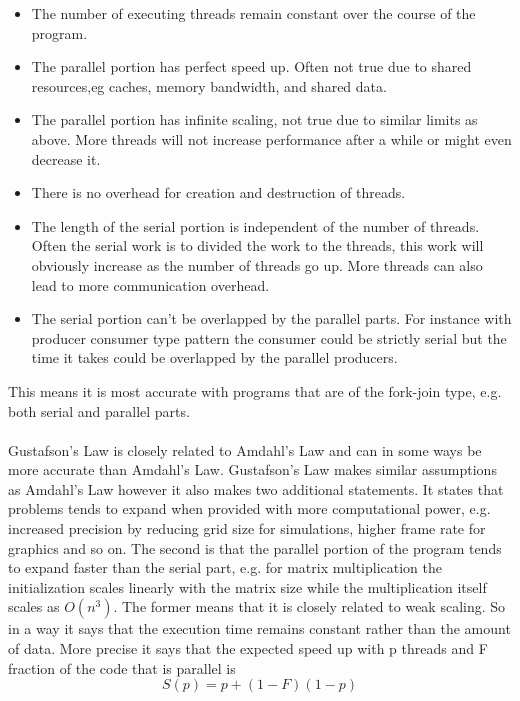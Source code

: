 \documentclass[10pt,a4paper]{report}
\begin{document}
\begin{itemize}
  \item The number of executing threads remain constant over the course of the program.
  \item The parallel portion has perfect speed up. Often not true due to shared resources,eg caches, memory bandwidth, and shared data.
  \item The parallel portion has infinite scaling, not true due to similar limits as above. More threads will not increase performance after a while or might even decrease it.
  \item There is no overhead for creation and destruction of threads.
  \item The length of the serial portion is independent of the number of threads. Often the serial work is to divided the work to the threads, this work will obviously increase as the number of threads go up. More threads can also lead to more communication overhead.
  \item The serial portion can't be overlapped by the parallel parts. For instance with producer consumer type pattern the consumer could be strictly serial but the time it takes could be overlapped by the parallel producers.
\end{itemize}

This means it is most accurate with programs that are of the fork-join type, e.g. both serial and parallel parts.\\
\\
Gustafson's Law is closely related to Amdahl's Law and can in some ways be more accurate than Amdahl's Law. Gustafson's Law makes similar assumptions as Amdahl's Law however it also makes two additional statements. It states that problems tends to expand when provided with more computational power, e.g. increased precision by reducing grid size for simulations, higher frame rate for graphics and so on. The second is that the parallel portion of the program tends to expand faster than the serial part, e.g. for matrix multiplication the initialization scales linearly with the matrix size while the multiplication itself scales as $O(n^3)$. The former means that it is closely related to weak scaling. So in a way it says that the execution time remains constant rather than the amount of data. More precise it says that the expected speed up with p threads and F fraction of the code that is parallel is\cite{gustafson1988reevaluating, cuda_best_practice}
$$S(p)=p+(1-F)(1-p)$$
\end{document}
